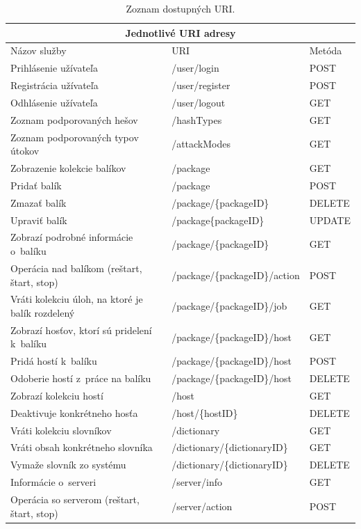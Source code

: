 \documentclass[../projekt.tex]{subfiles}
\begin{document}
\begin{table}[h]
	\begin{center}
        \begin{tabular}{ |p{7.7cm}|p{4.9cm}|p{1.5cm}|  }
         \hline
         \multicolumn{3}{|c|}{Jednotlivé URI adresy} \\
         \hline
         Názov služby& URI& Metóda\\
         \hline
         Prihlásenie užívateľa& /user/login & POST\\
         Registrácia užívateľa& /user/register& POST\\
         Odhlásenie užívateľa& /user/logout& GET\\
         Zoznam podporovaných hešov & /hashTypes & GET\\
         Zoznam podporovaných typov útokov & /attackModes & GET\\
         Zobrazenie kolekcie balíkov & /package & GET\\
         Pridať balík & /package & POST\\
         Zmazať balík & /package/\{packageID\} & DELETE\\
         Upraviť balík & /package\{packageID\} & UPDATE\\
         Zobrazí podrobné informácie o~balíku& /package/\{packageID\} & GET\\
         Operácia nad balíkom (reštart, štart, stop) & /package/\{packageID\}/action & POST\\
         Vráti kolekciu úloh, na ktoré je balík rozdelený& /package/\{packageID\}/job & GET\\
         Zobrazí hosťov, ktorí sú pridelení k~balíku & /package/\{packageID\}/host & GET\\
         Pridá hostí k~balíku & /package/\{packageID\}/host & POST\\
         Odoberie hostí z~práce na balíku & /package/\{packageID\}/host & DELETE\\
         Zobrazí kolekciu hostí& /host & GET\\
         Deaktivuje konkrétneho hosťa& /host/\{hostID\} & DELETE\\
         Vráti kolekciu slovníkov& /dictionary & GET\\
         Vráti obsah konkrétneho slovníka& /dictionary/\{dictionaryID\} & GET\\
         Vymaže slovník zo systému& /dictionary/\{dictionaryID\} & DELETE\\
         Informácie o~serveri& /server/info& GET\\
         Operácia so serverom (reštart, štart, stop) & /server/action & POST\\
         \hline
        \end{tabular}
  		\caption{Zoznam dostupných URI.}
  		\label{zoznamURItable}
	\end{center}
\end{table}
\end{document}
